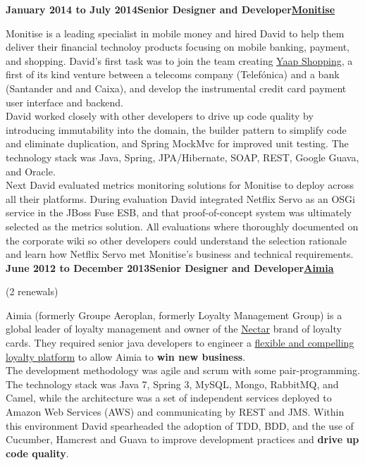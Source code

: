 \documentclass[a4paper,12pt]{article}
\newcommand{\head}[1]{\begin{center}{\large{\textbf{\sc{#1}}}}\nopagebreak\end{center}}
\newcommand{\clientwork}[3]{\textbf{#1\hfill#3\hfill#2}\nopagebreak}
\newcommand{\renewals}[2]{(#2)\nopagebreak}
\begin{document}
\head{Career History}

\clientwork{January 2014 to July 2014}{\href{http://www.monitise.com/}{Monitise}}{Senior Designer and Developer}

Monitise is a leading specialist in mobile money and hired David to help them deliver their financial technoloy products focusing on mobile banking, payment, and shopping. David's first task was to join the team creating \href{http://www.yaapshopping.com/}{Yaap Shopping}, a first of its kind venture between a telecoms company (Telef\'onica) and a bank (Santander and and Caixa), and develop the instrumental credit card payment user interface and backend.\\

David worked closely with other developers to drive up code quality by introducing immutability into the domain, the builder pattern to simplify code and eliminate duplication, and Spring MockMvc for improved unit testing. The technology stack was Java, Spring, JPA/Hibernate, SOAP, REST, Google Guava, and Oracle.\\

Next David evaluated metrics monitoring solutions for Monitise to deploy across all their platforms. During evaluation David integrated Netflix Servo as an OSGi service in the JBoss Fuse ESB, and that proof-of-concept system was ultimately selected as the metrics solution. All evaluations where thoroughly documented on the corporate wiki so other developers could understand the selection rationale and learn how Netflix Servo met Monitise's business and technical requirements.\\

\clientwork{June 2012 to December 2013}{\href{http://www.aimia.com/}{Aimia}}{Senior Designer and Developer}

\renewals{18 months}{2 renewals}

Aimia (formerly Groupe Aeroplan, formerly Loyalty Management Group) is a global leader of loyalty management and owner of the \href{http://www.nectar.com/}{Nectar} brand of loyalty cards. They required senior java developers to engineer a \href{http://www.aimia.com/English/Services/Aimia-Systems/Loyalty-Platform}{flexible and compelling loyalty platform} to allow Aimia to \textbf{win new business}.\\

The development methodology was agile and scrum with some pair-programming.  The technology stack was Java 7, Spring 3, MySQL, Mongo, RabbitMQ, and Camel, while the architecture was a set of independent services deployed to Amazon Web Services (AWS) and communicating by REST and JMS. Within this environment David spearheaded the adoption of TDD, BDD, and the use of Cucumber, Hamcrest and Guava to improve development practices and \textbf{drive up code quality}.\\
\end{document}
